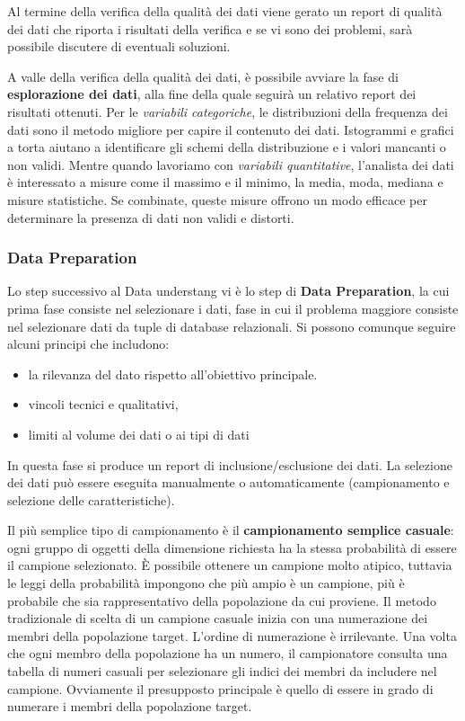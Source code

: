 \documentclass[a4paper]{extarticle}
\begin{document}
Al termine della verifica della qualità dei dati viene gerato un report di qualità dei dati che riporta i risultati della verifica e se vi sono dei problemi, sarà possibile discutere di eventuali soluzioni.

A valle della verifica della qualità dei dati, è possibile avviare la fase di \textbf{esplorazione dei dati}, alla fine della quale seguirà un relativo report dei risultati ottenuti. Per le \textit{variabili categoriche}, le distribuzioni della frequenza dei dati sono il metodo migliore per capire il contenuto dei dati. Istogrammi e grafici a torta aiutano a identificare gli schemi della distribuzione e i valori mancanti o non validi. Mentre quando lavoriamo con \textit{variabili quantitative}, l'analista dei dati è interessato a misure come il massimo e il minimo, la media, moda, mediana e misure statistiche. Se combinate, queste misure offrono un modo efficace per determinare la presenza di dati non validi e distorti.

\subsubsection{Data Preparation}
Lo step successivo al Data understang vi è lo step di \textbf{Data Preparation}, la cui prima fase consiste nel selezionare i dati, fase in cui il problema maggiore consiste nel selezionare dati da tuple di database relazionali. Si possono comunque seguire alcuni principi che includono:
\begin{itemize}
\item la rilevanza del dato rispetto all'obiettivo principale.
\item vincoli tecnici e qualitativi,
\item limiti al volume dei dati o ai tipi di dati
\end{itemize}
In questa fase si produce un report di inclusione/esclusione dei dati. La selezione dei dati può essere eseguita manualmente o automaticamente (campionamento e selezione delle caratteristiche).

Il più semplice tipo di campionamento è il \textbf{campionamento semplice casuale}: ogni gruppo di oggetti della dimensione richiesta ha la stessa probabilità di essere il campione selezionato. È possibile ottenere un campione molto atipico, tuttavia le leggi della probabilità impongono che più ampio è un campione, più è probabile che sia rappresentativo della popolazione da cui proviene. Il metodo tradizionale di scelta di un campione casuale inizia con una numerazione dei membri della popolazione target. L'ordine di numerazione è irrilevante. Una volta che ogni membro della popolazione ha un numero, il campionatore consulta una tabella di numeri casuali per selezionare gli indici dei membri da includere nel campione. Ovviamente il presupposto principale è quello di essere in grado di numerare i membri della popolazione target. 
\end{document}
